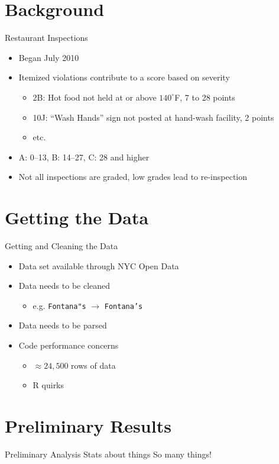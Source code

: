 \documentclass[12pt]{beamer}
\begin{document}
\section{Background}
\begin{frame}{Restaurant Inspections}
\begin{itemize}
	\vfill
	\item Began July 2010
	\vfill
	\item Itemized violations contribute to a score based on severity
	\begin{itemize}
		\item 2B: Hot food not held at or above $140^{\circ}$F, 7 to 28 points
		\item 10J: ``Wash Hands'' sign not posted at hand-wash facility, 2 points
		\item etc. 
	\end{itemize}
	\vfill
	\item A: 0--13, B: 14--27, C: 28 and higher
	\vfill
	\item Not all inspections are graded, low grades lead to re-inspection
	\vfill
\end{itemize}
\end{frame}

\section{Getting the Data}
\begin{frame}{Getting and Cleaning the Data}
\begin{itemize}
	\vfill
	\item Data set available through NYC Open Data
	\vfill
	\item Data needs to be cleaned
	\begin{itemize}
		\item e.g. \texttt{Fontana"s} $\rightarrow$ \texttt{Fontana's}
	\end{itemize}
	\vfill
	\item Data needs to be parsed
	\vfill
	\item Code performance concerns
	\begin{itemize}
		\item $\approx24,500$ rows of data
		\item R quirks
	\end{itemize}
	\vfill
\end{itemize}
\end{frame}

\section{Preliminary Results}
\begin{frame}{Preliminary Analysis}
Stats about things
So many things!
\end{frame}
\end{document}
